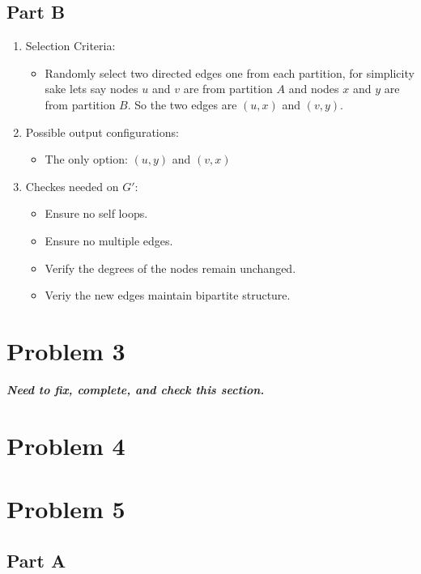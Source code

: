 \documentclass[12pt]{article}
\begin{document}
\subsection*{Part B}
\begin{enumerate}
    \item Selection Criteria:
    \begin{itemize}
        \item Randomly select two directed edges one from each partition, for simplicity sake lets say nodes \( u \) and \( v \) are from partition \( A \) and nodes \( x \) and \( y \) are from partition \( B \). So the two edges are \( (u,x) \) and \( (v,y) \).
    \end{itemize}
    \item Possible output configurations:
    \begin{itemize}
        \item The only option: \( (u, y)\) and \( (v, x) \)
    \end{itemize}
    \item Checkes needed on $G'$:   
    \begin{itemize}
        \item Ensure no self loops.
        \item Ensure no multiple edges.
        \item Verify the degrees of the nodes remain unchanged.
        \item Veriy the new edges maintain bipartite structure.
    \end{itemize}
\end{enumerate}

\section*{Problem 3}

\textbf{\textit{Need to fix, complete, and check this section.}}\\

\section*{Problem 4}
\section*{Problem 5}
\subsection*{Part A}
\end{document}
